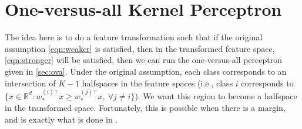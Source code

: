 \documentclass{article}
\newcommand{\e}{\mathbf{e}}
\begin{document}
\section{One-versus-all Kernel Perceptron}
The idea here is to do a feature transformation such that if the original assumption \eqref{eqn:weaker} is satisfied, then in the transformed feature space, \eqref{eqn:stronger} will be satisfied, then we can run the one-versus-all perceptron given in \ref{sec:ova}. Under the original assumption, each class corresponds to an intersection of $K-1$ halfspaces in the feature spaces (i.e., class $i$ corresponds to $\{x\in\mathbb{R}^d: w_*^{(i)\top}x \geq w_*^{(j)\top}x, \ \forall j\neq i\}$). We want this region to become a halfspace in the transformed space. Fortunately, this is possible when there is a margin, and is exactly what is done in \cite{klivans2004learning}. 
\end{document}
